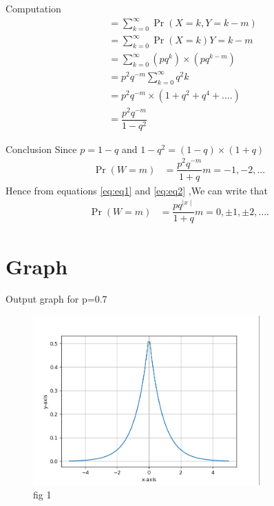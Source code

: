 \documentclass{beamer}
\providecommand{\pr}[1]{\ensuremath{\Pr\left(#1\right)}}
\begin{document}
     \begin{frame}{Computation}
     \begin{align}
     &=\sum\limits_{k=0}^\infty \pr{X=k,Y=k-m}\\
     &=\sum\limits_{k=0}^\infty \pr{X=k}{Y=k-m}\\
     &=\sum\limits_{k=0}^\infty (p q^k) \times (p q^{k-m})\\
     &=p^2 q^{-m} \sum\limits_{k=0}^\infty q^2k\\
     &=p^2 q^{-m} \times (1+q^2 + q^4 +....)\\
     &=\dfrac{p^2 q^{-m}}{1-q^2} 
     \end{align}
    
     \end{frame}
     
     \begin{frame}{Conclusion}
      Since $p=1-q$ and $1-q^2=(1-q) \times (1+q)$
	 \begin{align}
	 \label{eq:eq2}
	 \pr{W=m}&=\dfrac{p^2 q^{-m}}{1+q} m=-1,-2,...
	 \end{align}
	     Hence from equations \eqref{eq:eq1} and \eqref{eq:eq2} ,We can write that
	     \begin{align}
	   \pr{W=m}&=\dfrac{p q^{\mid x \mid}}{1+q} m=0,\pm 1,\pm 2,....       
	     \end{align}
	 \end{frame} 
	 \section{Graph}
\begin{frame}{Output graph for p=0.7}
    \begin{figure}[!ht]
		\centering
		\includegraphics[width=\textwidth,height=6.5cm,keepaspectratio]{figures/fig1.png}
		\caption{fig 1}
		\label{fig1}
	\end{figure}
\end{frame}
	 
\end{document}
